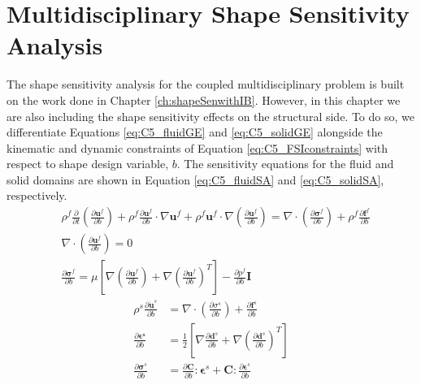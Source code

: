 \section{Multidisciplinary Shape Sensitivity Analysis}
The shape sensitivity analysis for the coupled multidisciplinary problem is built on the work done in Chapter \ref{ch:shapeSenwithIB}. However, in this chapter we are also including the shape sensitivity effects on the structural side. To do so, we differentiate Equations \eqref{eq:C5_fluidGE} and \eqref{eq:C5_solidGE} alongside the kinematic and dynamic constraints of Equation \eqref{eq:C5_FSIconstraints} with respect to shape design variable, $b$. The sensitivity equations for the fluid and solid domains are shown in Equation \eqref{eq:C5_fluidSA} and \eqref{eq:C5_solidSA}, respectively.
%
\begin{subequations}\label{eq:C5_fluidSA}
\begin{align}
	&\rho^f \frac{\partial}{\partial t} \left( \frac{\partial \mathbf{u}^f}{\partial b} \right) + 
	\rho^f \frac{\partial \mathbf{u}^f}{\partial b} \cdot \nabla \mathbf{u}^f +
	\rho^f \mathbf{u}^f \cdot \nabla \left( \frac{\partial \mathbf{u}^f}{\partial b} \right) = 
	\nabla \cdot \left( \frac{\partial \mathbf{\sigma}^f}{\partial b} \right) +
	\rho^f \frac{\partial \mathbf{f}^f}{\partial b}
	\\
	&\nabla \cdot \left( \frac{\partial \mathbf{u}^f}{\partial b} \right) = 0
	\\
	&\frac{\partial \mathbf{\sigma}^f}{\partial b} = 
	\mu \left[ \nabla \left( \frac{\partial \mathbf{u}^f}{\partial b} \right) + 
	           \nabla \left( \frac{\partial \mathbf{u}^f}{\partial b} \right)^T \right] - 
	\frac{\partial p^f}{\partial b} \mathbf{I}
\end{align}
\end{subequations}
%
\begin{subequations}\label{eq:C5_solidSA}
\begin{align}
	\rho^s \frac{\partial \dot{\mathbf{u}}^s}{\partial b} &= 
	\nabla \cdot \left( \frac{\partial \sigma^s}{\partial b} \right) + 
	\frac{\partial \mathbf{f}^s}{\partial b}
	\\
	\frac{\partial \mathbf{\epsilon^s}}{\partial b} &=
	\frac{1}{2}
	\left[ \nabla \frac{\partial \mathbf{d}^s}{\partial b} + \nabla \left( \frac{\partial \mathbf{d}^s}{\partial b} \right)^T \right]
	\\
	\frac{\partial \mathbf{\sigma}^s}{\partial b} &= 
	\frac{\partial \mathbf{C}}{\partial b} : \mathbf{\epsilon}^s + 
	\mathbf{C} : \frac{\partial \mathbf{\epsilon}^s}{\partial b}
\end{align}
\end{subequations}
